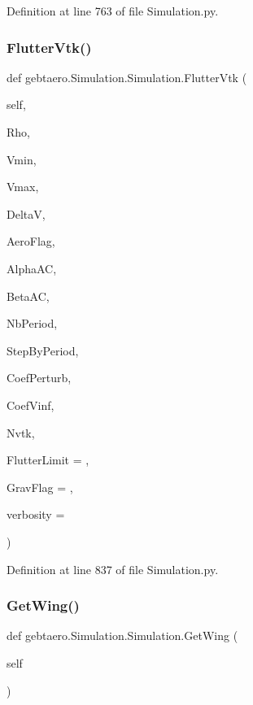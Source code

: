 Definition at line 763 of file Simulation.\+py.

\mbox{\label{classgebtaero_1_1_simulation_1_1_simulation_ac4f1096583af146da5e23f4365958f3a}} 
\subsubsection{\texorpdfstring{Flutter\+Vtk()}{FlutterVtk()}}
{\footnotesize\ttfamily def gebtaero.\+Simulation.\+Simulation.\+Flutter\+Vtk (\begin{DoxyParamCaption}\item[{}]{self,  }\item[{}]{Rho,  }\item[{}]{Vmin,  }\item[{}]{Vmax,  }\item[{}]{DeltaV,  }\item[{}]{Aero\+Flag,  }\item[{}]{Alpha\+AC,  }\item[{}]{Beta\+AC,  }\item[{}]{Nb\+Period,  }\item[{}]{Step\+By\+Period,  }\item[{}]{Coef\+Perturb,  }\item[{}]{Coef\+Vinf,  }\item[{}]{Nvtk,  }\item[{}]{Flutter\+Limit = {},  }\item[{}]{Grav\+Flag = {},  }\item[{}]{verbosity = {} }\end{DoxyParamCaption})}



Definition at line 837 of file Simulation.\+py.

\mbox{\label{classgebtaero_1_1_simulation_1_1_simulation_a2d7432b48522221861693e98b03568c4}} 
\subsubsection{\texorpdfstring{Get\+Wing()}{GetWing()}}
{\footnotesize\ttfamily def gebtaero.\+Simulation.\+Simulation.\+Get\+Wing (\begin{DoxyParamCaption}\item[{}]{self }\end{DoxyParamCaption})}



